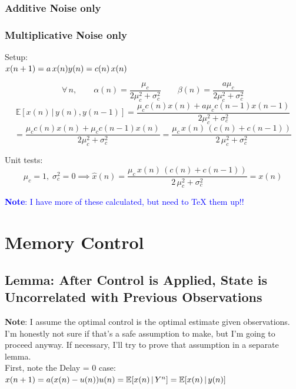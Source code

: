 \documentclass[14pt]{extarticle}
\begin{document}
\subsubsection{Additive Noise only}

\subsubsection{Multiplicative Noise only}
Setup: \\
\begin{math}
x(n+1) = a \, x(n) \\
y(n) = c(n) \, x(n) \\
\end{math}

\[ \forall \, n, \quad \quad \alpha(n) = \frac{\mu_c}{2\mu_c^2 + \sigma_c^2} \quad \quad \beta(n) = \frac{a\mu_c}{2\mu_c^2 + \sigma_c^2} \]
\[ \mathbb{E}[x(n) \, | \, y(n), y(n-1)] = \frac{ \mu_c c(n) x(n) + a \mu_c c(n-1) x(n-1) }{2\mu_c^2 + \sigma_c^2} \]
\[ = \frac{\mu_c c(n) x(n) + \mu_c c(n-1) x(n)}{2\mu_c^2 + \sigma_c^2} = \frac{\mu_c \, x(n) \, ( c(n) + c(n-1))}{2\, \mu_c^2 + \sigma_c^2} \]

Unit tests:
\[ \mu_c = 1, \; \sigma_c^2 = 0 \implies \hat{x}(n) = \frac{\mu_c \, x(n) \, ( c(n) + c(n-1))}{2\, \mu_c^2 + \sigma_c^2} = x(n) \] 

\textcolor{blue}{\textbf{Note}: I have more of these calculated, but need to TeX them up!!}

\section*{Memory Control}

\subsection*{Lemma: After Control is Applied, State is Uncorrelated with Previous Observations}

\textbf{Note}: I assume the optimal control is the optimal estimate given observations. I'm honestly not sure if that's a safe assumption to make, but I'm going to proceed anyway. If necessary, I'll try to prove that assumption in a separate lemma. \\

First, note the Delay = 0 case: \\
\begin{math}
x(n+1) = a(x(n) - u(n)) \\
u(n) = \mathbb{E}[x(n) \, | \, Y^n] = \mathbb{E}[x(n) \, | \, y(n)] \\
\end{math}
\end{document}
